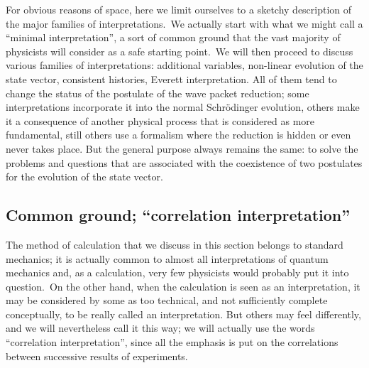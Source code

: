 \documentclass[12pt,onecolumn]{article}%
\begin{document}
For obvious reasons of space, here we limit ourselves to a sketchy description
of the major families of interpretations.\ We actually start with what we
might call a ``minimal interpretation'', a sort of common ground that the vast
majority of physicists will consider as a safe starting point.\ We will then
proceed to discuss various families of interpretations: additional variables,
non-linear evolution of the state vector, consistent histories, Everett
interpretation. All of them tend to change the status of the postulate of the
wave packet reduction; some interpretations incorporate it into the normal
Schr\"{o}dinger evolution, others make it a consequence of another physical
process that is considered as more fundamental, still others use a formalism
where the reduction is hidden or even never takes place. But the general
purpose always remains the same: to solve the problems and questions that are
associated with the coexistence of two postulates for the evolution of the
state vector.

\subsection{Common ground; ``correlation interpretation''}

\label{correlation}

The method of calculation that we discuss in this section belongs to standard
mechanics; it is actually common to almost all interpretations of quantum
mechanics and, as a calculation, very few physicists would probably put it
into question.\ On the other hand, when the calculation is seen as an
interpretation, it may be considered by some as too technical, and not
sufficiently complete conceptually, to be really called an interpretation. But
others may feel differently, and we will nevertheless call it this way; we
will actually use the words ``correlation interpretation'', since all the
emphasis is put on the correlations between successive results of experiments.
\end{document}

